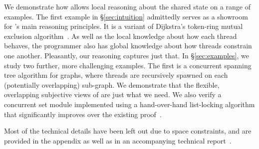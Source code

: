 

 We demonstrate how
\colosl allows local reasoning about the shared state on a range of
examples.  The first example in \S\ref{sec:intuition} admittedly
serves as a showroom for \colosl's main reasoning principles. It is a
variant of Dijkstra's token-ring mutual exclusion
algorithm~\cite{dijkstra74}. As well as the local knowledge about how
each thread behaves, the programmer also has global knowledge about
how threads constrain one another. Pleasantly, our reasoning captures
just that. In \S\ref{sec:examples}, we study two further, more
challenging examples. The first is a concurrent spanning tree
algorithm for graphs, where threads are recursively spawned on each
(potentially overlapping) sub-graph. We demonstrate that the flexible,
overlapping subjective views of \colosl are just what we need.  We
also verify a concurrent set module implemented using a hand-over-hand
list-locking algorithm that significantly improves over the existing
proof~\cite{cap-ecoop10}.
%

Most of the technical details have been left out due to space
constraints, and are provided in the appendix as well as in an
accompanying technical report~\cite{colosl-tr14}.

